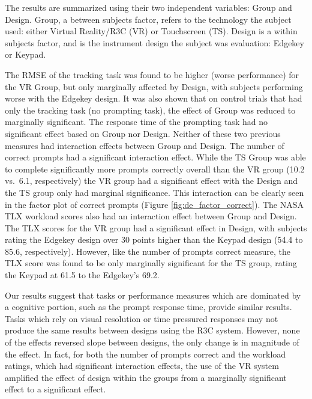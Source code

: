 The results are summarized using their two independent variables: Group and Design.
Group, a between subjects factor, refers to the technology the subject used: either Virtual Reality/R3C (VR) or Touchscreen (TS).
Design is a within subjects factor, and is the instrument design the subject was evaluation: Edgekey or Keypad.

The RMSE of the tracking task was found to be higher (worse performance) for the VR Group, but only marginally affected by Design, with subjects performing worse with the Edgekey design.
It was also shown that on control trials that had only the tracking task (no prompting task), the effect of Group was reduced to marginally significant.
The response time of the prompting task had no significant effect based on Group nor Design.
Neither of these two previous measures had interaction effects between Group and Design.
The number of correct prompts had a significant interaction effect.
While the TS Group was able to complete significantly more prompts correctly overall than the VR group (10.2 vs.\ 6.1, respectively) the VR group had a significant effect with the Design and the TS group only had marginal significance.
This interaction can be clearly seen in the factor plot of correct prompts (Figure \ref{fig:de_factor_correct}).
The NASA TLX workload scores also had an interaction effect between Group and Design.
The TLX scores for the VR group had a significant effect in Design, with subjects rating the Edgekey design over 30 points higher than the Keypad design (54.4 to 85.6, respectively).
However, like the number of prompts correct measure, the TLX score was found to be only marginally significant for the TS group, rating the Keypad at 61.5 to the Edgekey's 69.2.


Our results suggest that tasks or performance measures which are dominated by a cognitive portion, such as the prompt response time, provide similar results.
Tasks which rely on visual resolution or time pressured responses may not produce the same results between designs using the R3C system.
However, none of the effects reversed slope between designs, the only change is in magnitude of the effect.
In fact, for both the number of prompts correct and the workload ratings, which had significant interaction effects, the use of the VR system amplified the effect of design within the groups from a marginally significant effect to a significant effect.


